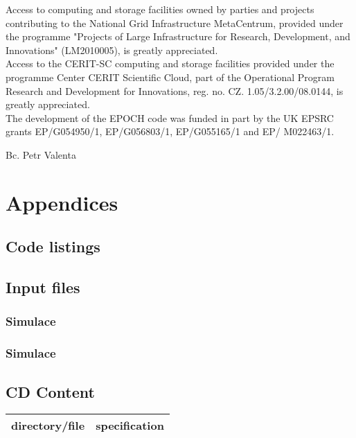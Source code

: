 \documentclass[12pt, twoside, a4paper, openright]{report}
\newcommand{\valenta}{Bc. Petr Valenta }
\begin{document}
Access to computing and storage facilities owned by parties and projects contributing to the National Grid Infrastructure MetaCentrum, provided under the programme "Projects of Large Infrastructure for Research, Development, and Innovations" (LM2010005), is greatly appreciated.\\

Access to the CERIT-SC computing and storage facilities provided under the programme Center CERIT Scientific Cloud, part of the Operational Program Research and Development for Innovations, reg. no. CZ. 1.05/3.2.00/08.0144, is greatly  appreciated.\\

The development of the EPOCH code was funded in part by the UK EPSRC grants EP/G054950/1, EP/G056803/1, EP/G055165/1 and EP/ M022463/1.\\
\begin{flushright}
\valenta
\end{flushright}


\newpage
{}




\part*{Appendices}

\appendix

\chapter{Code listings}

\chapter{Input files}

\section{Simulace}

\section{Simulace}

\chapter{CD Content}
\centering
{\renewcommand{\arraystretch}{1.4}
	\begin{tabular}{ll}
		\hline \textbf{directory/file} & \textbf{specification} \\
		\hline
		\hline
	\end{tabular}
}
\end{document}
